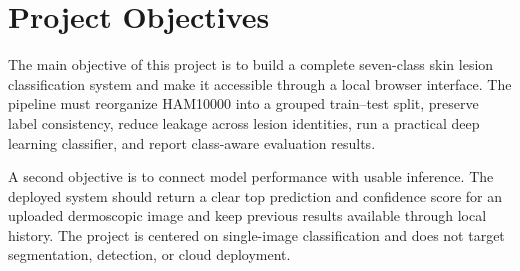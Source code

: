 \section{Project Objectives}

The main objective of this project is to build a complete seven-class skin lesion classification system and make it accessible through a local browser interface. The pipeline must reorganize HAM10000 into a grouped train--test split, preserve label consistency, reduce leakage across lesion identities, run a practical deep learning classifier, and report class-aware evaluation results.

A second objective is to connect model performance with usable inference. The deployed system should return a clear top prediction and confidence score for an uploaded dermoscopic image and keep previous results available through local history. The project is centered on single-image classification and does not target segmentation, detection, or cloud deployment.
